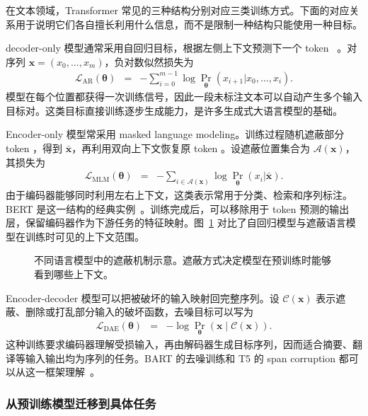 在文本领域，Transformer 常见的三种结构分别对应三类训练方式。下面的对应关系用于说明它们各自擅长利用什么信息，而不是限制一种结构只能使用一种目标。

decoder-only 模型通常采用自回归目标，根据左侧上下文预测下一个 token ~\cite{radford-etal:2018improving}。对序列 $\mathbf{x}=(x_0,\ldots,x_m)$，负对数似然损失为
\begin{eqnarray}
\mathcal{L}_{\mathrm{AR}}(\boldsymbol{\theta})
& = &
-
\sum_{i=0}^{m-1}
\log
\Pr_{\boldsymbol{\theta}}
(x_{i+1}|x_0,\ldots,x_i).
\end{eqnarray}
模型在每个位置都获得一次训练信号，因此一段未标注文本可以自动产生多个输入目标对。这类目标直接训练逐步生成能力，是许多生成式大语言模型的基础。

Encoder-only 模型常采用 masked language modeling。训练过程随机遮蔽部分 token ，得到 $\bar{\mathbf{x}}$，再利用双向上下文恢复原 token 。设遮蔽位置集合为 $\mathcal{A}(\mathbf{x})$，其损失为
\begin{eqnarray}
\mathcal{L}_{\mathrm{MLM}}(\boldsymbol{\theta})
& = &
-
\sum_{i\in\mathcal{A}(\mathbf{x})}
\log
\Pr_{\boldsymbol{\theta}}(x_i|\bar{\mathbf{x}}).
\end{eqnarray}
由于编码器能够同时利用左右上下文，这类表示常用于分类、检索和序列标注。BERT 是这一结构的经典实例~\cite{DevlinEtAl2019BERT}。训练完成后，可以移除用于 token 预测的输出层，保留编码器作为下游任务的特征映射。图~\ref{fig:nlpbook-masking-language-models} 对比了自回归模型与遮蔽语言模型在训练时可见的上下文范围。

\begin{figure}[htbp]
  \centering
  
  \caption{不同语言模型中的遮蔽机制示意。遮蔽方式决定模型在预训练时能够看到哪些上下文。}
  \label{fig:nlpbook-masking-language-models}
\end{figure}

Encoder-decoder 模型可以把被破坏的输入映射回完整序列。设 $\mathcal{C}(\mathbf{x})$ 表示遮蔽、删除或打乱部分输入的破坏函数，去噪目标可以写为
\begin{eqnarray}
\mathcal{L}_{\mathrm{DAE}}(\boldsymbol{\theta})
& = &
-\log
\Pr_{\boldsymbol{\theta}}
(\mathbf{x}\mid\mathcal{C}(\mathbf{x})).
\end{eqnarray}
这种训练要求编码器理解受损输入，再由解码器生成目标序列，因而适合摘要、翻译等输入输出均为序列的任务。BART 的去噪训练和 T5 的 span corruption 都可以从这一框架理解~\cite{LewisEtAl2020BART,RaffelEtAl2020T5}。

\subsubsection{从预训练模型迁移到具体任务}

